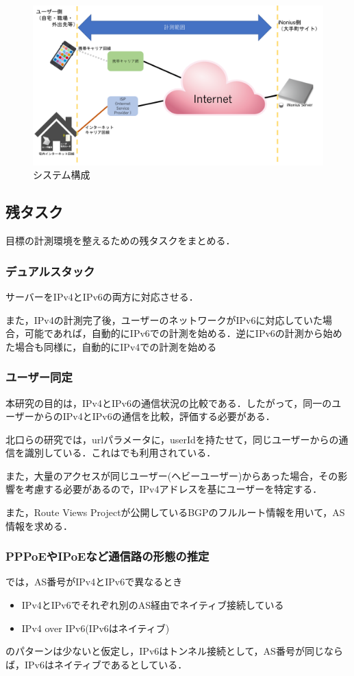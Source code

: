 \documentclass[rinkou,a4paper]{ieicej}
\begin{document}
\begin{figure}[p]
\centering
\includegraphics[scale = 0.25]{structure.png}
\caption{システム構成}\label{struct}
\end{figure}

\subsection{残タスク}
目標の計測環境を整えるための残タスクをまとめる．
\subsubsection{デュアルスタック}
サーバーをIPv4とIPv6の両方に対応させる．

また，IPv4の計測完了後，ユーザーのネットワークがIPv6に対応していた場合，可能であれば，自動的にIPv6での計測を始める．逆にIPv6の計測から始めた場合も同様に，自動的にIPv4での計測を始める
\subsubsection{ユーザー同定}
本研究の目的は，IPv4とIPv6の通信状況の比較である．したがって，同一のユーザーからのIPv4とIPv6の通信を比較，評価する必要がある．

北口らの研究\cite{kitaguchi1}では，urlパラメータに，userIdを持たせて，同じユーザーからの通信を識別している．これは\cite{kitaguchi2}でも利用されている．

また，大量のアクセスが同じユーザー(ヘビーユーザー)からあった場合，その影響を考慮する必要があるので，IPv4アドレスを基にユーザーを特定する．

また，Route Views Project\cite{routeview}が公開しているBGPのフルルート情報を用いて，AS情報を求める．

\subsubsection{PPPoEやIPoEなど通信路の形態の推定}
\cite{kitaguchi1}では，AS番号がIPv4とIPv6で異なるとき
\begin{itemize}
 \item IPv4とIPv6でそれぞれ別のAS経由でネイティブ接続している
 \item IPv4 over IPv6(IPv6はネイティブ)
\end{itemize}
のパターンは少ないと仮定し，IPv6はトンネル接続として，AS番号が同じならば，IPv6はネイティブであるとしている．
\end{document}
